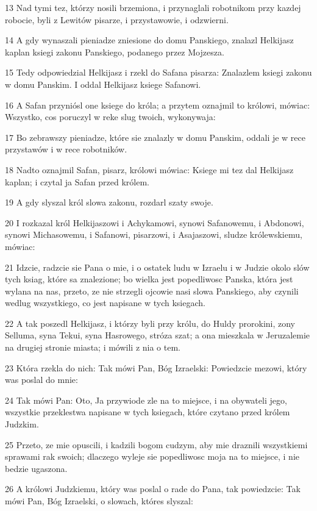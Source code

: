 \par 13 Nad tymi tez, którzy nosili brzemiona, i przynaglali robotnikom przy kazdej robocie, byli z Lewitów pisarze, i przystawowie, i odzwierni.
\par 14 A gdy wynaszali pieniadze zniesione do domu Panskiego, znalazl Helkijasz kaplan ksiegi zakonu Panskiego, podanego przez Mojzesza.
\par 15 Tedy odpowiedzial Helkijasz i rzekl do Safana pisarza: Znalazlem ksiegi zakonu w domu Panskim. I oddal Helkijasz ksiege Safanowi.
\par 16 A Safan przyniósl one ksiege do króla; a przytem oznajmil to królowi, mówiac: Wszystko, cos poruczyl w reke slug twoich, wykonywaja:
\par 17 Bo zebrawszy pieniadze, które sie znalazly w domu Panskim, oddali je w rece przystawów i w rece robotników.
\par 18 Nadto oznajmil Safan, pisarz, królowi mówiac: Ksiege mi tez dal Helkijasz kaplan; i czytal ja Safan przed królem.
\par 19 A gdy slyszal król slowa zakonu, rozdarl szaty swoje.
\par 20 I rozkazal król Helkijaszowi i Achykamowi, synowi Safanowemu, i Abdonowi, synowi Michasowemu, i Safanowi, pisarzowi, i Asajaszowi, sludze królewskiemu, mówiac:
\par 21 Idzcie, radzcie sie Pana o mie, i o ostatek ludu w Izraelu i w Judzie okolo slów tych ksiag, które sa znalezione; bo wielka jest popedliwosc Panska, która jest wylana na nas, przeto, ze nie strzegli ojcowie nasi slowa Panskiego, aby czynili wedlug wszystkiego, co jest napisane w tych ksiegach.
\par 22 A tak poszedl Helkijasz, i którzy byli przy królu, do Huldy prorokini, zony Selluma, syna Tekui, syna Hasrowego, stróza szat; a ona mieszkala w Jeruzalemie na drugiej stronie miasta; i mówili z nia o tem.
\par 23 Która rzekla do nich: Tak mówi Pan, Bóg Izraelski: Powiedzcie mezowi, który was poslal do mnie:
\par 24 Tak mówi Pan: Oto, Ja przywiode zle na to miejsce, i na obywateli jego, wszystkie przeklestwa napisane w tych ksiegach, które czytano przed królem Judzkim.
\par 25 Przeto, ze mie opuscili, i kadzili bogom cudzym, aby mie draznili wszystkiemi sprawami rak swoich; dlaczego wyleje sie popedliwosc moja na to miejsce, i nie bedzie ugaszona.
\par 26 A królowi Judzkiemu, który was poslal o rade do Pana, tak powiedzcie: Tak mówi Pan, Bóg Izraelski, o slowach, któres slyszal:
